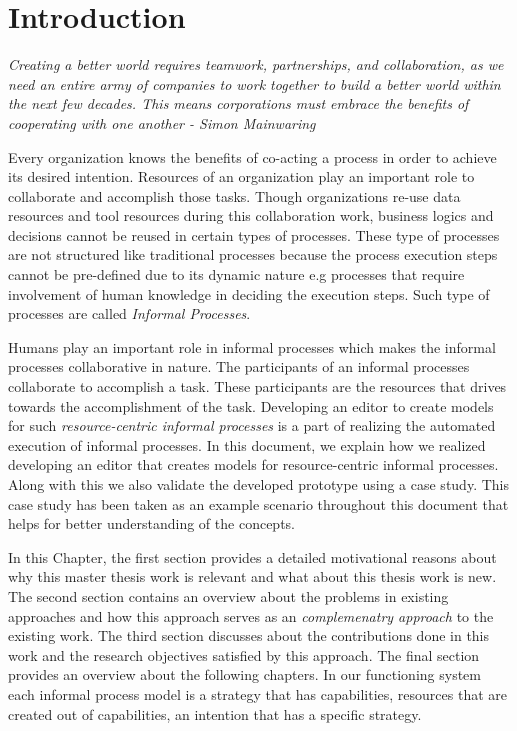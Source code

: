 \chapter{Introduction}
\label{chap:introduction}
\begin{center}
	\textit{Creating a better world requires teamwork, partnerships, and collaboration, as we need an entire army of companies to work together to build a better world within the next few decades. This means corporations must embrace the benefits of cooperating with one another -  Simon Mainwaring}
\end{center}

 Every organization knows the benefits of co-acting a process in order to achieve its desired intention. Resources of an organization play an important role to collaborate and accomplish those tasks. Though organizations re-use data resources and tool resources during this collaboration work, business logics and decisions cannot be reused in certain types of processes. These type of processes are not structured like traditional processes because the process execution steps cannot be pre-defined due to its dynamic nature e.g processes that require involvement of human knowledge in deciding the execution steps\cite{Sungur2014}. Such type of processes are called \textit{Informal Processes}.

Humans play an important role in informal processes which makes the informal processes collaborative in nature. The participants of an informal processes collaborate to accomplish a task. These participants are the resources that drives towards the accomplishment of the task.  Developing an editor to create models for such \textit{resource-centric informal processes} is a part of realizing the automated execution of informal processes. In this document, we explain how we realized developing an editor that creates models for resource-centric informal processes. Along with this we also validate the developed prototype using a case study. This case study has been taken as an example scenario throughout this document that helps for better understanding of the concepts.

In this Chapter, the first section provides a detailed motivational reasons about why this master thesis work is relevant and what about this thesis work is new.  The second section contains an overview about the problems in existing approaches and how this approach serves as an \textit{complemenatry approach} to the existing work. The third section discusses about the contributions done in this work  and the research objectives satisfied by this approach. The final section provides an overview about the following chapters. In our functioning system each informal process model is a strategy that has capabilities, resources that are created out of capabilities, an intention that has a specific strategy. 

